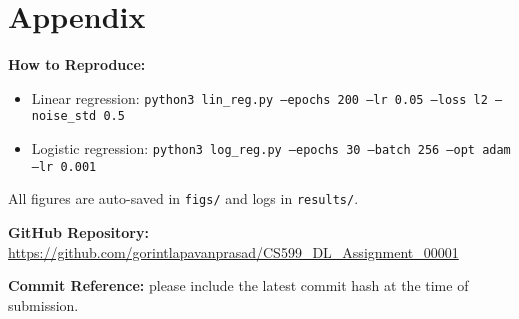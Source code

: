 \documentclass{article}
\begin{document}
\section*{Appendix}
\textbf{How to Reproduce:}
\begin{itemize}
    \item Linear regression: \texttt{python3 lin\_reg.py --epochs 200 --lr 0.05 --loss l2 --noise\_std 0.5}
    \item Logistic regression: \texttt{python3 log\_reg.py --epochs 30 --batch 256 --opt adam --lr 0.001}
\end{itemize}
All figures are auto-saved in \texttt{figs/} and logs in \texttt{results/}.  

\textbf{GitHub Repository:} \\
\url{https://github.com/gorintlapavanprasad/CS599_DL_Assignment_00001}

\textbf{Commit Reference:} please include the latest commit hash at the time of submission.
\end{document}
